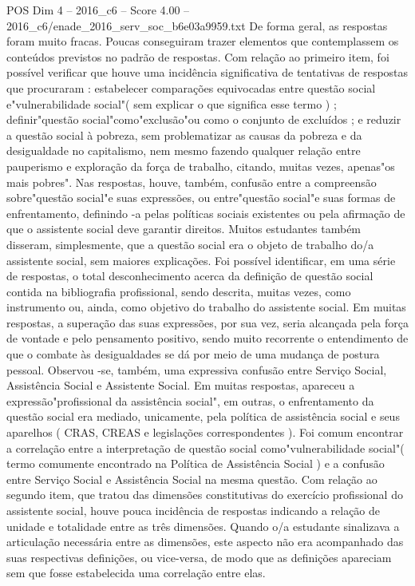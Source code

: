 \begin{textsample}{POS Dim 4 – 2016\_c6 – Score 4.00 – 2016\_c6/enade\_2016\_serv\_soc\_b6e03a9959.txt}
De forma geral, as respostas foram muito fracas.
Poucas conseguiram trazer elementos que contemplassem os conteúdos previstos no padrão de respostas.
Com relação ao primeiro item, foi possível verificar que houve uma incidência significativa de tentativas de respostas que procuraram : estabelecer comparações equivocadas entre questão social e"vulnerabilidade social"( sem explicar o que significa esse termo ) ; definir"questão social"como"exclusão"ou como o conjunto de excluídos ; e reduzir a questão social à pobreza, sem problematizar as causas da pobreza e da desigualdade no capitalismo, nem mesmo fazendo qualquer relação entre pauperismo e exploração da força de trabalho, citando, muitas vezes, apenas"os mais pobres".
Nas respostas, houve, também, confusão entre a compreensão sobre"questão social"e suas expressões, ou entre"questão social"e suas formas de enfrentamento, definindo -a pelas políticas sociais existentes ou pela afirmação de que o assistente social deve garantir direitos.
Muitos estudantes também disseram, simplesmente, que a questão social era o objeto de trabalho do/a assistente social, sem maiores explicações.
Foi possível identificar, em uma série de respostas, o total desconhecimento acerca da definição de questão social contida na bibliografia profissional, sendo descrita, muitas vezes, como instrumento ou, ainda, como objetivo do trabalho do assistente social.
Em muitas respostas, a superação das suas expressões, por sua vez, seria alcançada pela força de vontade e pelo pensamento positivo, sendo muito recorrente o entendimento de que o combate às desigualdades se dá por meio de uma mudança de postura pessoal.
Observou -se, também, uma expressiva confusão entre Serviço Social, Assistência Social e Assistente Social.
Em muitas respostas, apareceu a expressão"profissional da assistência social", em outras, o enfrentamento da questão social era mediado, unicamente, pela política de assistência social e seus aparelhos ( CRAS, CREAS e legislações correspondentes ).
Foi comum encontrar a correlação entre a interpretação de questão social como"vulnerabilidade social"( termo comumente encontrado na Política de Assistência Social ) e a confusão entre Serviço Social e Assistência Social na mesma questão.
Com relação ao segundo item, que tratou das dimensões constitutivas do exercício profissional do assistente social, houve pouca incidência de respostas indicando a relação de unidade e totalidade entre as três dimensões.
Quando o/a estudante sinalizava a articulação necessária entre as dimensões, este aspecto não era acompanhado das suas respectivas definições, ou vice-versa, de modo que as definições apareciam sem que fosse estabelecida uma correlação entre elas.

\end{textsample}
